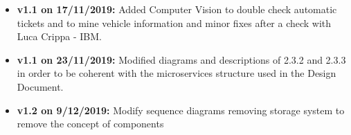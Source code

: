 \begin{itemize}
\item \textbf{v1.1 on 17/11/2019:} Added Computer Vision to double check automatic tickets and to mine vehicle information and minor fixes after a check with Luca Crippa - IBM.
\item \textbf{v1.1 on 23/11/2019:} Modified diagrams and descriptions of 2.3.2 and 2.3.3 in order to be coherent with the microservices structure used in the Design Document.
\item \textbf{v1.2 on 9/12/2019:} Modify sequence diagrams removing storage system to remove the concept of components
\end{itemize}